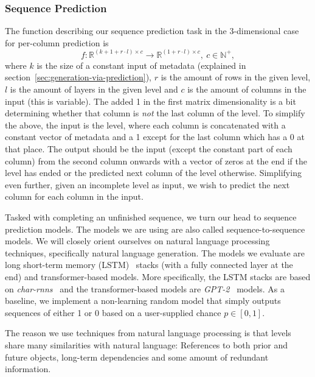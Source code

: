 \subsubsection{Sequence Prediction}
\label{sec:sequence-prediction}

The function describing our sequence prediction task in the
3-dimensional case for per-column prediction is
\begin{equation*}
  f: \mathbb{R}^{(k + 1 + r \cdot l) \times c} \to \mathbb{R}^{(1 + r \cdot l) \times c},\ c \in \mathbb{N}^{+},
\end{equation*}
where $k$ is the size of a constant input of metadata (explained in
section~\ref{sec:generation-via-prediction}), $r$ is the amount of
rows in the given level, $l$ is the amount of layers in the given
level and $c$ is the amount of columns in the input (this is
variable). The added 1 in the first matrix dimensionality is a bit
determining whether that column is \emph{not} the last column of the
level. To simplify the above, the input is the level, where each
column is concatenated with a constant vector of metadata and a 1
except for the last column which has a 0 at that place. The output
should be the input (except the constant part of each column) from the
second column onwards with a vector of zeros at the end if the level
has ended or the predicted next column of the level otherwise.
Simplifying even further, given an incomplete level as input, we wish
to predict the next column for each column in the input.

Tasked with completing an unfinished sequence, we turn our head to
sequence prediction models. The models we are using are also called
sequence-to-sequence models. We will closely orient ourselves on
natural language processing techniques, specifically natural language
generation. The models we evaluate are long short-term memory
(LSTM)~\cite{hochreiterLongShorttermMemory1997} stacks (with a fully
connected layer at the end) and transformer-based models. More
specifically, the LSTM stacks are based on
\emph{char-rnns}~\cite{andrejKarpathyCharrnn2019} and the
transformer-based models are
\emph{GPT-2}~\cite{radfordLanguageModelsAre,OpenaiGpt22019,HuggingfaceTransformers2019}
models. As a baseline, we implement a non-learning random model that
simply outputs sequences of either 1 or 0 based on a user-supplied
chance $p \in [0, 1]$.

The reason we use techniques from natural language processing is that
levels share many similarities with natural language: References to
both prior and future objects, long-term dependencies and some amount
of redundant information.

